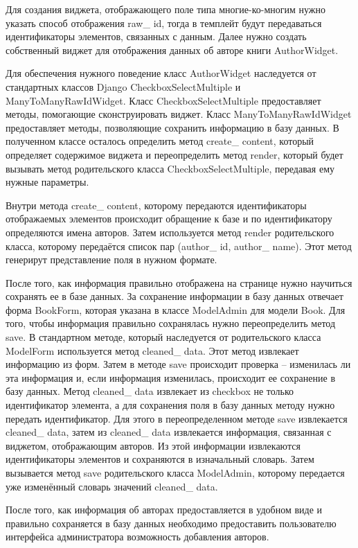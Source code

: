 \documentclass[a4paper]{report}
\begin{document}
Для создания виджета, отображающего поле типа многие-ко-многим нужно указать способ отображения raw\_ id, тогда в темплейт будут передаваться идентификаторы элементов, связанных с данным. Далее нужно создать собственный виджет для отображения данных об авторе книги AuthorWidget. 

Для обеспечения нужного поведение класс AuthorWidget наследуется от стандартных классов Django CheckboxSelectMultiple и ManyToManyRawIdWidget. Класс CheckboxSelectMultiple предоставляет методы, помогающие сконструировать виджет. Класс ManyToManyRawIdWidget предоставляет методы, позволяющие сохранить информацию в базу данных. В полученном классе осталось определить метод create\_ content, который определяет содержимое виджета и переопределить метод render, который будет вызывать метод родительского класса CheckboxSelectMultiple, передавая ему нужные параметры. 

Внутри метода create\_ content, которому передаются идентификаторы отображаемых элементов происходит обращение к базе и по идентификатору определяются имена авторов. Затем используется метод render родительского класса, которому передаётся список пар (author\_ id, author\_ name). Этот метод генерирут представление поля в нужном формате.

После того, как информация правильно отображена на странице нужно научиться сохранять ее в базе данных. За сохранение  информации в базу данных отвечает форма BookForm, которая указана в классе ModelAdmin для модели Book. Для того, чтобы информация правильно сохранялась нужно переопределить метод save. В стандартном методе, который наследуется от родительского класса ModelForm используется метод cleaned\_ data. Этот метод извлекает информацию из форм. Затем в методе save происходит проверка -- изменилась ли эта информация и, если информация изменилась, происходит ее сохранение в базу данных. Метод cleaned\_ data извлекает из checkbox не только идентификатор элемента, а для сохранения поля в базу данных методу нужно передать идентификатор. Для этого в переопределенном методе save извлекается cleaned\_ data, затем из cleaned\_ data извлекается информация, связанная с виджетом, отображающим авторов. Из этой информации извлекаются идентификаторы элементов и сохраняются в изначальный словарь. Затем вызывается метод save родительского класса ModelAdmin, которому передается уже изменённый словарь значений cleaned\_ data. 

После того, как информация об авторах предоставляется в удобном виде и правильно сохраняется в базу данных необходимо предоставить пользователю интерфейса администратора возможность добавления авторов. 
\end{document}
